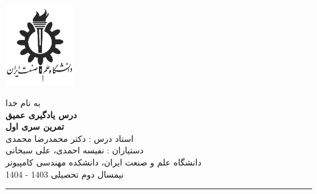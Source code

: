 \begin{minipage}{0.1\textwidth}
\includegraphics[width=3cm]{etc/IUST}
\end{minipage}%
\hfill%
\begin{minipage}{0.6\textwidth}\centering
\fontsize{13pt}{13pt}\selectfont
به‌ نام خدا \\
\textbf{درس یادگیری عمیق} \\
\textbf{تمرین سری اول}\\
استاد درس : دکتر محمدرضا محمدی \\
دستیاران :  نفیسه احمدی، علی سبحانی\\
\vspace{0.25cm}
\begingroup
\fontsize{11pt}{11pt}\selectfont
دانشگاه علم و صنعت ایران، دانشکده مهندسی کامپیوتر \\
نیمسال دوم تحصیلی 1403 - 1404 \\
\endgroup
\end{minipage}%
\hfill%
\begin{minipage}{0.1\textwidth}
\end{minipage}

\vspace{0.5cm}

\noindent\rule{\textwidth}{1pt}